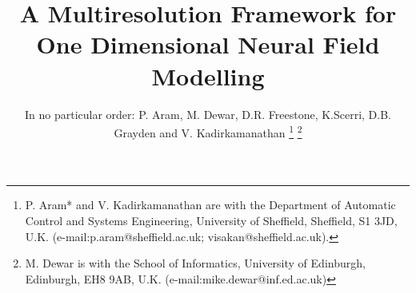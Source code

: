 \documentclass[journal,a4paper]{IEEEtran}
\begin{document}
%
\title{A Multiresolution Framework for One Dimensional Neural Field Modelling }
%
%
%

\author{In no particular order: P. Aram, M. Dewar, D.R. Freestone, K.Scerri, D.B. Grayden and V. Kadirkamanathan %
\thanks{P. Aram* and V. Kadirkamanathan are with the Department of Automatic Control and Systems Engineering, University of Sheffield, Sheffield, S1 3JD, U.K. (e-mail:p.aram@sheffield.ac.uk; visakan@sheffield.ac.uk).}%
\thanks{M. Dewar is with the School of Informatics, University of Edinburgh, Edinburgh, EH8 9AB, U.K. (e-mail:mike.dewar@inf.ed.ac.uk)}}%

% 
%



% 
 \ifCLASSOPTIONpeerreview
\else
\fi
\end{document}

